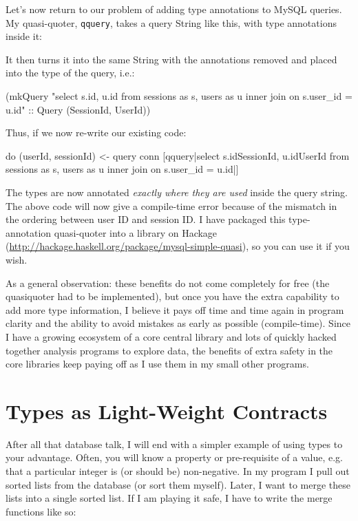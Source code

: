 \documentclass{tmr}
\begin{document}
Let's now return to our problem of adding type annotations to MySQL queries.  My quasi-quoter, \lstinline|qquery|, takes a query String like this, with type annotations inside it:

\begin{code}
[qquery|select s.id{SessionId}, u.id{UserId} from sessions as s, users as u
   inner join on s.user_id = u.id|]
\end{code}

It then turns it into the same String with the annotations removed and placed into the type of the query, i.e.:

\begin{code}
(mkQuery "select s.id, u.id from sessions as s, users as u inner join
  on s.user_id = u.id" :: Query (SessionId, UserId))
\end{code}

Thus, if we now re-write our existing code:

\begin{code}
do (userId, sessionId) <- query conn [qquery|select s.id{SessionId},
     u.id{UserId} from sessions as s, users as u
     inner join on s.user_id = u.id|]
\end{code}

The types are now annotated \textit{exactly where they are used} inside the query string.  The above code will now give a compile-time error because of the mismatch in the ordering between user ID and session ID\@.  I have packaged this  type-annotation quasi-quoter into a library on Hackage (\url{http://hackage.haskell.org/package/mysql-simple-quasi}), so you can use it if you wish.

As a general observation: these benefits do not come completely for free (the quasiquoter had to be implemented), but once you have the extra capability to add more type information, I believe it pays off time and time again in program clarity and the ability to avoid mistakes as early as possible (compile-time).  Since I have a growing ecosystem of a core central library and lots of quickly hacked together analysis programs to explore data, the benefits of extra safety in the core libraries keep paying off as I use them in my small other programs.

\section{Types as Light-Weight Contracts}

After all that database talk, I will end with a simpler example of using types to your advantage. Often, you will know a property or pre-requisite of a value, e.g. that a particular integer is (or should be) non-negative.  In my program I pull out sorted lists from the database (or sort them myself).  Later, I want to merge these lists into a single sorted list.  If I am playing it safe, I have to write the merge functions like so:
\end{document}
